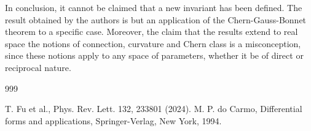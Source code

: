 \documentclass[aps, prl,12pt,reprint]{revtex4-2}
\begin{document}
In conclusion, it cannot be claimed that a new invariant has been defined. The result obtained by the authors is but an application of the Chern-Gauss-Bonnet theorem to a specific case. Moreover, the claim that the results extend to real space the notions of connection, curvature and Chern class is a misconception, since these notions apply to any space of parameters, whether it be of direct or reciprocal nature.











































\begin{thebibliography}{999}




 T. Fu et al., Phys. Rev. Lett. 132, 233801 (2024).
  M. P. do Carmo, Differential forms and applications, Springer-Verlag, New York, 1994.

\end{thebibliography}
\end{document}
